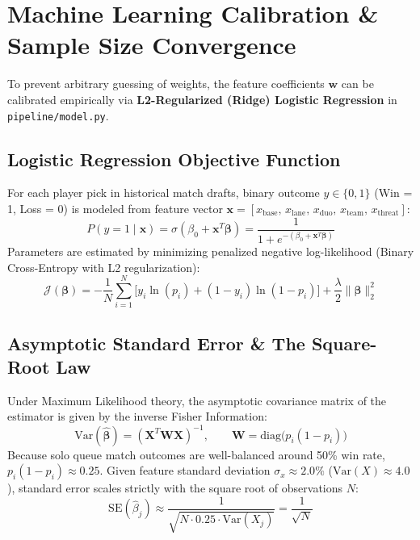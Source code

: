 \documentclass[11pt,a4paper]{article}
\begin{document}
\section{Machine Learning Calibration \& Sample Size Convergence}

To prevent arbitrary guessing of weights, the feature coefficients $\boldsymbol{w}$ can be calibrated empirically via \textbf{L2-Regularized (Ridge) Logistic Regression} in \texttt{pipeline/model.py}.

\subsection{Logistic Regression Objective Function}
For each player pick in historical match drafts, binary outcome $y \in \{0, 1\}$ (Win = 1, Loss = 0) is modeled from feature vector $\mathbf{x} = [x_{\text{base}},\, x_{\text{lane}},\, x_{\text{duo}},\, x_{\text{team}},\, x_{\text{threat}}]$:
\begin{equation}
P(y = 1 \mid \mathbf{x}) = \sigma\left(\beta_0 + \mathbf{x}^T \boldsymbol{\beta}\right) = \frac{1}{1 + e^{-(\beta_0 + \mathbf{x}^T \boldsymbol{\beta})}}
\end{equation}
Parameters are estimated by minimizing penalized negative log-likelihood (Binary Cross-Entropy with L2 regularization):
\begin{equation}
\mathcal{J}(\boldsymbol{\beta}) = - \frac{1}{N} \sum_{i=1}^N \Big[ y_i \ln(p_i) + (1 - y_i) \ln(1 - p_i) \Big] + \frac{\lambda}{2} \|\boldsymbol{\beta}\|_2^2
\end{equation}

\subsection{Asymptotic Standard Error \& The Square-Root Law}
Under Maximum Likelihood theory, the asymptotic covariance matrix of the estimator is given by the inverse Fisher Information:
\begin{equation}
\text{Var}(\hat{\boldsymbol{\beta}}) = (\mathbf{X}^T \mathbf{W} \mathbf{X})^{-1}, \qquad \mathbf{W} = \text{diag}\big(p_i(1 - p_i)\big)
\end{equation}
Because solo queue match outcomes are well-balanced around 50\% win rate, $p_i(1 - p_i) \approx 0.25$. Given feature standard deviation $\sigma_x \approx 2.0\%$ ($\text{Var}(X) \approx 4.0$), standard error scales strictly with the square root of observations $N$:
\begin{equation}
\text{SE}(\hat{\beta}_j) \approx \frac{1}{\sqrt{N \cdot 0.25 \cdot \text{Var}(X_j)}} = \frac{1}{\sqrt{N}}
\end{equation}
\end{document}
